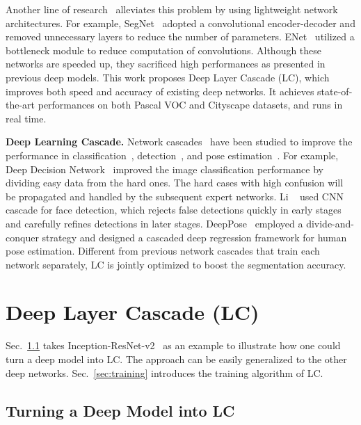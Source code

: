 \documentclass[10pt,twocolumn,letterpaper]{article}
\begin{document}
Another line of research~\cite{badrinarayanan2015segnet, liu2016learning, paszke2016enet} alleviates this problem by using lightweight network architectures.
For example, SegNet~\cite{badrinarayanan2015segnet} adopted a convolutional encoder-decoder and removed unnecessary layers to reduce the number of parameters.
ENet~\cite{paszke2016enet} utilized a bottleneck module to reduce computation of convolutions.
Although these networks are speeded up, they sacrificed high performances as presented in previous deep models.
This work proposes Deep Layer Cascade (LC), which improves both speed and accuracy of existing deep networks.
It achieves state-of-the-art performances on both Pascal VOC and Cityscape datasets, and runs in real time.

\noindent
\textbf{Deep Learning Cascade.}
Network cascades~\cite{cai2015learning, li2015convolutional, murthy2016deep, toshev2014deeppose, liu2016fashion} have been studied to improve the performance in classification~\cite{murthy2016deep}, detection~\cite{li2015convolutional}, and pose estimation~\cite{toshev2014deeppose}.
For example, Deep Decision Network~\cite{murthy2016deep} improved the image classification performance by dividing easy data from the hard ones.
The hard cases with high confusion will be propagated and handled by the subsequent expert networks.
Li \etal~\cite{li2015convolutional} used CNN cascade for face detection, which rejects false detections quickly in early stages and carefully refines detections in later stages.
DeepPose~\cite{toshev2014deeppose} employed a divide-and-conquer strategy and designed a cascaded deep regression framework for human pose estimation.
Different from previous network cascades that train each network separately,  
LC is jointly optimized to boost the segmentation accuracy.
 
\section{Deep Layer Cascade (LC)}
\label{sec:methodology}







Sec.~\ref{sec:turning_into_LC} takes Inception-ResNet-v2~\cite{szegedy2016inception} as an example to illustrate how one could turn a deep model into LC.
The approach can be easily generalized to the other deep networks.
Sec.~\ref{sec:training} introduces the training algorithm of LC.

\subsection{Turning a Deep Model into LC}
\label{sec:turning_into_LC}
\end{document}
